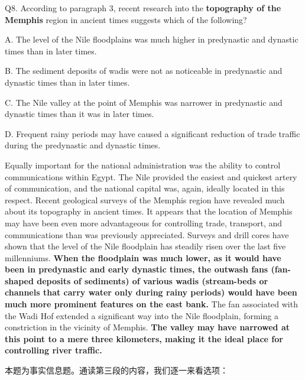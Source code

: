 \begin{blk}
    \begin{qst}
        Q8. According to paragraph 3, recent research into the \textbf{topography of the Memphis} region in ancient times suggests which of the following?
    \end{qst}

    \begin{chc}
        A. The level of the Nile floodplains was much higher in predynastic and dynastic times than in later times.

        B. The sediment deposits of wadis were not as noticeable in predynastic and dynastic times than in later times.

        C. The Nile valley at the point of Memphis was narrower in predynastic and dynastic times than it was in later times.

        D. Frequent rainy periods may have caused a significant reduction of trade traffic during the predynastic and dynastic times.
    \end{chc}

    \begin{psgq}
        Equally important for the national administration was the ability to control communications within Egypt. The Nile provided the easiest and quickest artery of communication, and the national capital was, again, ideally located in this respect. Recent geological surveys of the Memphis region have revealed much about its topography in ancient times. It appears that the location of Memphis may have been even more advantageous for controlling trade, transport, and communications than was previously appreciated. Surveys and drill cores have shown that the level of the Nile floodplain has steadily risen over the last five millenniums. \textbf{When the floodplain was much lower, as it would have been in predynastic and early dynastic times, the outwash fans (fan-shaped deposits of sediments) of various wadis (stream-beds or channels that carry water only during rainy periods) would have been much more prominent features on the east bank.} The fan associated with the Wadi Hof extended a significant way into the Nile floodplain, forming a constriction in the vicinity of Memphis. \textbf{The valley may have narrowed at this point to a mere three kilometers, making it the ideal place for controlling river traffic.}
    \end{psgq}

    \begin{nlz}
        本题为事实信息题。通读第三段的内容，我们逐一来看选项：


\end{nlz}
\end{blk}
